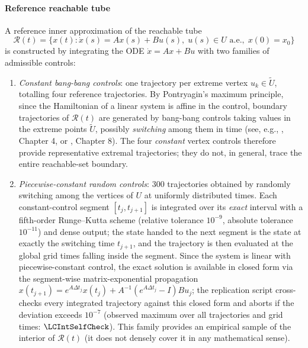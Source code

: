 \documentclass[11pt]{elsarticle}
\theoremstyle{definition}
\theoremstyle{remark}
\numberwithin{equation}{section}
\begin{document}
\paragraph{Reference reachable tube}
A reference inner approximation of the reachable tube
\begin{equation}
  \label{eq:reachable-tube}
  \mathcal{R}(t)
  =
  \bigl\{
    x(t)
    :
    \dot{x}(s) = Ax(s) + Bu(s),\;
    u(s) \in U \text{ a.e.},\;
    x(0) = x_0
  \bigr\}
\end{equation}
is constructed by integrating the ODE $\dot{x} = Ax + Bu$ with two families
of admissible controls:
\begin{enumerate}
	\item[(a)] \emph{Constant bang-bang controls}: one trajectory per extreme
	vertex $u_k \in \widetilde{U}$, totalling four reference trajectories.
	By Pontryagin's maximum principle, since the Hamiltonian of a linear
	system is affine in the control, boundary trajectories of
	$\mathcal{R}(t)$ are generated by bang-bang controls taking values in
	the extreme points $\widetilde{U}$, possibly \emph{switching} among
	them in time (see, e.g., \cite{LeeMarkus1967}, Chapter 4, or
	\cite{aubin_cellina_1984}, Chapter 8). The four \emph{constant} vertex
	controls therefore provide representative extremal trajectories; they do
	not, in general, trace the entire reachable-set boundary.
  \item[(b)] \emph{Piecewise-constant random controls}: 300 trajectories obtained
        by randomly switching among the vertices of $U$ at uniformly
        distributed times. Each constant-control segment
        $[t_j,t_{j+1}]$ is integrated over its \emph{exact} interval with a
        fifth-order Runge--Kutta scheme (relative tolerance $10^{-9}$,
        absolute tolerance $10^{-11}$) and dense output; the state handed to
        the next segment is the state at exactly the switching time
        $t_{j+1}$, and the trajectory is then evaluated at the global grid
        times falling inside the segment. Since the system is linear with
        piecewise-constant control, the exact solution is available in
        closed form via the segment-wise matrix-exponential propagation
        $x(t_{j+1}) = e^{A\Delta t_j}x(t_j) + A^{-1}(e^{A\Delta t_j}-I)Bu_j$;
        the replication script cross-checks every integrated trajectory
        against this closed form and aborts if the deviation exceeds
        $10^{-7}$ (observed maximum over all trajectories and grid times:
        $\LCIntSelfCheck$).
        This family provides an empirical sample of the interior of
        $\mathcal{R}(t)$ (it does not densely cover it in any
        mathematical sense).
\end{enumerate}
\end{document}
